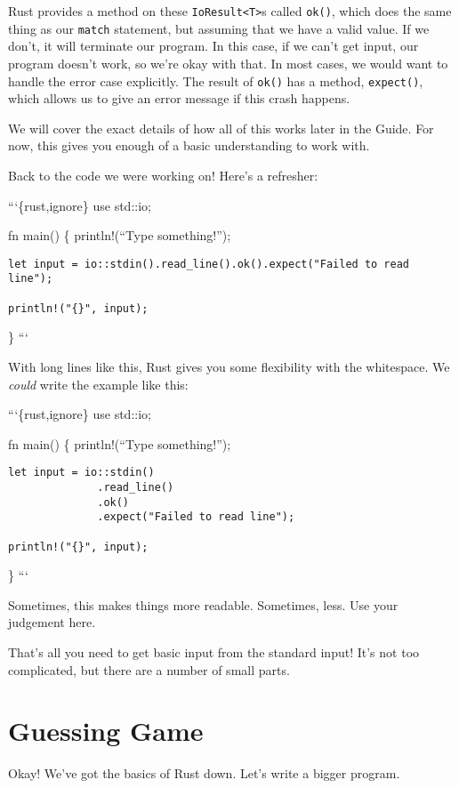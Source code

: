 \documentclass[]{article}
\begin{document}
Rust provides a method on these
\texttt{IoResult\textless{}T\textgreater{}}s called \texttt{ok()}, which
does the same thing as our \texttt{match} statement, but assuming that
we have a valid value. If we don't, it will terminate our program. In
this case, if we can't get input, our program doesn't work, so we're
okay with that. In most cases, we would want to handle the error case
explicitly. The result of \texttt{ok()} has a method, \texttt{expect()},
which allows us to give an error message if this crash happens.

We will cover the exact details of how all of this works later in the
Guide. For now, this gives you enough of a basic understanding to work
with.

Back to the code we were working on! Here's a refresher:

```\{rust,ignore\} use std::io;

fn main() \{ println!(``Type something!'');

\begin{verbatim}
let input = io::stdin().read_line().ok().expect("Failed to read line");

println!("{}", input);
\end{verbatim}

\} ```

With long lines like this, Rust gives you some flexibility with the
whitespace. We \emph{could} write the example like this:

```\{rust,ignore\} use std::io;

fn main() \{ println!(``Type something!'');

\begin{verbatim}
let input = io::stdin()
              .read_line()
              .ok()
              .expect("Failed to read line");

println!("{}", input);
\end{verbatim}

\} ```

Sometimes, this makes things more readable. Sometimes, less. Use your
judgement here.

That's all you need to get basic input from the standard input! It's not
too complicated, but there are a number of small parts.

\section{Guessing Game}\label{guessing-game}

Okay! We've got the basics of Rust down. Let's write a bigger program.
\end{document}
